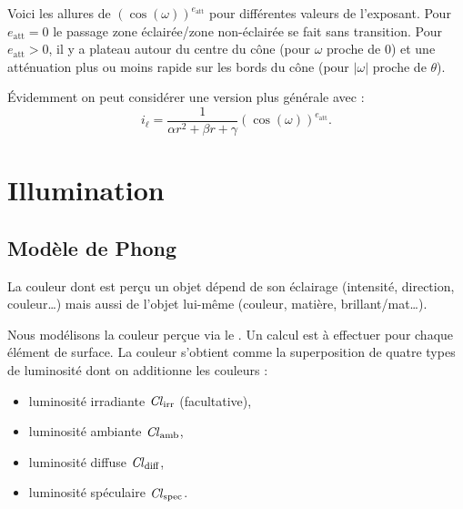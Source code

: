 \documentclass[11pt,class=report,crop=false]{standalone}
\begin{document}
Voici les allures de $\left(\cos(\omega)\right)^{e_\text{att}}$ pour différentes valeurs de l'exposant. Pour $e_\text{att} = 0$ le passage zone éclairée/zone non-éclairée se fait sans transition.
Pour $e_\text{att} > 0$, il y a plateau autour du centre du cône (pour $\omega$ proche de $0$) et une atténuation plus ou moins rapide sur les bords du cône (pour $|\omega|$ proche de $\theta$).

 
Évidemment on peut considérer une version plus générale avec :
$$i_\ell =\frac{1}{\alpha r^2 + \beta r +\gamma} \left(\cos(\omega)\right)^{e_\text{att}}.$$


\section{Illumination}

\subsection{Modèle de Phong}


La couleur dont est perçu un objet dépend de son éclairage (intensité, direction, couleur\ldots) mais aussi de l'objet lui-même (couleur, matière, brillant/mat\ldots).

Nous modélisons la couleur perçue via le .
Un calcul est à effectuer pour chaque élément de surface.
La couleur s'obtient comme la superposition  de quatre types de luminosité dont on additionne les couleurs :
\begin{itemize}
  \item luminosité irradiante $\operatorname{\it Cl}_{\text{irr}}$ (facultative),
  \item luminosité ambiante $\operatorname{\it Cl}_{\text{amb}}$,
  \item luminosité diffuse $\operatorname{\it Cl}_{\text{diff}}$,
  \item luminosité spéculaire $\operatorname{\it Cl}_{\text{spec}}$.
\end{itemize}
\end{document}
